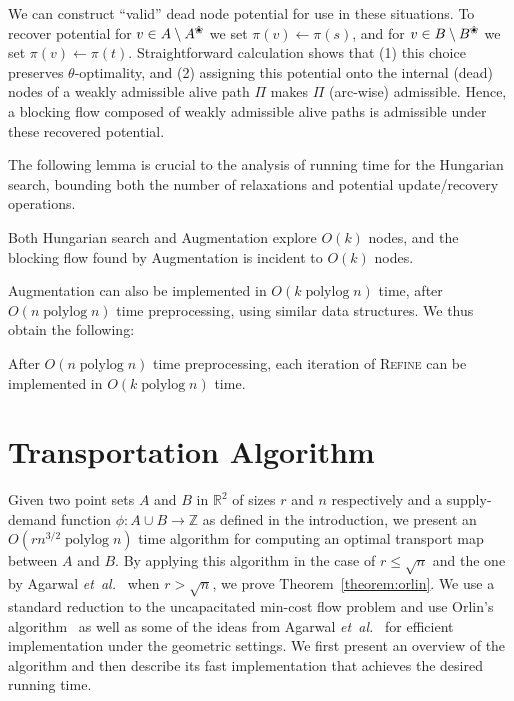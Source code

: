 \documentclass[a4paper,UKenglish]{socg-lipics-v2019}
\def\etal{\emph{et~al.}}
\def\etal{\textit{et~al.}}
\def\polylog{\mathop{\mathrm{polylog}}}
\def\reals{\mathbb{R}}
\def\ints{\mathbb{Z}}
\def\tsupply{\phi}
\def\alive#1{{#1}^\text{\ding{96}}}
\def\dead#1{{#1} \setminus \alive{#1}}
\theoremstyle{plain}
\numberwithin{figure}{section}
\begin{document}
We can construct ``valid'' dead node potential for use in these situations.
To recover potential for $v \in \dead{A}$ we set $\pi(v) \gets \pi(s)$,
and for $v \in \dead{B}$ we set $\pi(v) \gets \pi(t)$.
Straightforward calculation shows that (1) this choice preserves $\theta$-optimality,
and (2) assigning this potential onto the internal (dead) nodes of a weakly admissible
alive path $\Pi$ makes $\Pi$ (arc-wise) admissible.
Hence, a blocking flow composed of weakly admissible alive paths is admissible
under these recovered potential.

The following lemma is crucial to the analysis of running time for the Hungarian search,
bounding both the number of relaxations and potential update/recovery operations.

\begin{lemma}
\label{lemma:cost_scale_count}
Both Hungarian search and Augmentation explore $O(k)$ nodes,
and the blocking flow found by Augmentation is incident to $O(k)$ nodes.
\end{lemma}

Augmentation can also be implemented in $O(k\polylog n)$ time, after
$O(n\polylog n)$ time preprocessing, using similar data structures.
We thus obtain the following:

\begin{lemma}
\label{lemma:refine_iter_time}
After $O(n\polylog n)$ time preprocessing, each iteration of \textsc{Refine} can be
implemented in $O(k\polylog n)$ time.
\end{lemma}


\section{Transportation Algorithm}
\label{section:orlin}

Given two point sets $A$ and $B$ in $\reals^2$ of sizes $r$ and $n$ respectively
and a supply-demand function $\tsupply: A \cup B \to \ints$
as defined in the introduction, we present an $O(rn^{3/2}\polylog n)$ time
algorithm for computing an optimal transport map between $A$ and $B$.
By applying this algorithm in the case of $r \leq \sqrt{n}$ and the one by
Agarwal \etal~\cite{AFPVX17arxiv} when $r > \sqrt{n}$, we prove Theorem~\ref{theorem:orlin}.
We use a standard reduction to the uncapacitated min-cost flow problem and use
Orlin's algorithm~\cite{O93} as well as some of
the ideas from Agarwal \etal~\cite{AFPVX17arxiv} for efficient implementation under the geometric settings.
We first present an overview of the algorithm and then describe its fast
implementation that achieves the desired running time.
\end{document}
